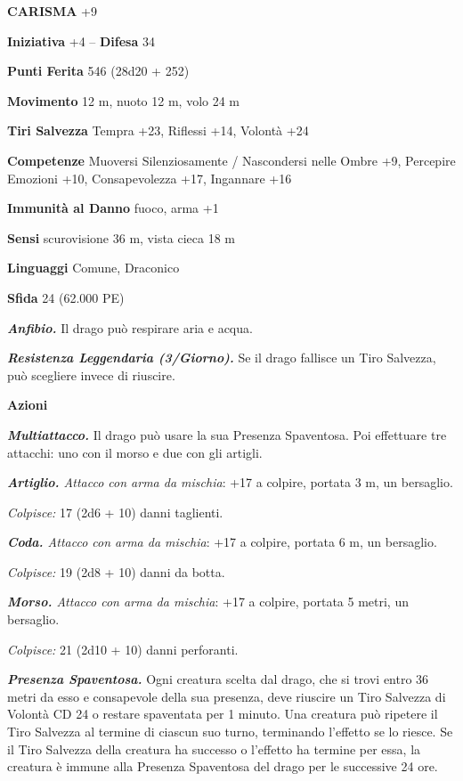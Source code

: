 \begin{multicols}{2}
\textbf{CARISMA} +9

\textbf{Iniziativa} +4 -- \textbf{Difesa} 34

\textbf{Punti Ferita} 546 (28d20 + 252)

\textbf{Movimento} 12 m, nuoto 12 m, volo 24 m

\textbf{Tiri Salvezza} Tempra +23, Riflessi +14, Volontà +24

\textbf{Competenze} Muoversi Silenziosamente / Nascondersi nelle Ombre +9, Percepire Emozioni +10, Consapevolezza +17, Ingannare +16

\textbf{Immunità al Danno} fuoco, arma +1

\textbf{Sensi} scurovisione 36 m, vista cieca 18 m

\textbf{Linguaggi} Comune, Draconico

\textbf{Sfida} 24 (62.000 PE)

\emph{\textbf{Anfibio.}} Il drago può respirare aria e acqua.

\emph{\textbf{Resistenza Leggendaria (3/Giorno).}} Se il drago fallisce un Tiro Salvezza, può scegliere invece di riuscire.

\textbf{Azioni}

\emph{\textbf{Multiattacco.}} Il drago può usare la sua Presenza Spaventosa. Poi effettuare tre attacchi: uno con il morso e due con gli artigli.

\emph{\textbf{Artiglio.} Attacco con arma da mischia}: +17 a colpire, portata 3 m, un bersaglio.

\emph{Colpisce:} 17 (2d6 + 10) danni taglienti.

\emph{\textbf{Coda.} Attacco con arma da mischia}: +17 a colpire, portata 6 m, un bersaglio.

\emph{Colpisce:} 19 (2d8 + 10) danni da botta.

\emph{\textbf{Morso.} Attacco con arma da mischia}: +17 a colpire, portata 5 metri, un bersaglio.

\emph{Colpisce:} 21 (2d10 + 10) danni perforanti.

\emph{\textbf{Presenza Spaventosa.}} Ogni creatura scelta dal drago, che si trovi entro 36 metri da esso e consapevole della sua presenza, deve riuscire un Tiro Salvezza di Volontà CD 24 o restare spaventata per 1 minuto. Una creatura può ripetere il Tiro Salvezza al termine di ciascun suo turno, terminando l'effetto se lo riesce. Se il Tiro Salvezza della creatura ha successo o l'effetto ha termine per essa, la creatura è immune alla Presenza Spaventosa del drago per le successive 24 ore.


\end{multicols}
